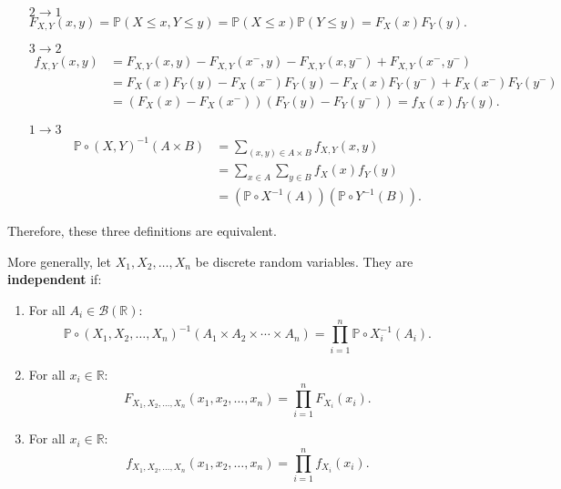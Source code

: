 \documentclass{huhtakm-template-book-v2}
\newcommand{\prob}{\mathbb{P}}
\begin{document}
    \begin{proofing}
        \begin{itemize}
            \item[$2 \to 1$]
            \begin{equation*}
                F_{X,Y}(x, y) = \prob(X \leq x,Y \leq y) = \prob(X \leq x)\prob(Y \leq y) = F_{X}(x)F_{Y}(y).
            \end{equation*}
            \item[$3 \to 2$]
            \begin{align*}
                f_{X,Y}(x, y) &= F_{X,Y}(x, y)-F_{X,Y}(x^{-},y)-F_{X,Y}(x,y^{-})+F_{X,Y}(x^{-},y^{-})\\
                &= F_{X}(x)F_{Y}(y)-F_{X}(x^{-})F_{Y}(y)-F_{X}(x)F_{Y}(y^{-})+F_{X}(x^{-})F_{Y}(y^{-})\\
                &= (F_{X}(x)-F_{X}(x^{-}))(F_{Y}(y)-F_{Y}(y^{-})) = f_{X}(x)f_{Y}(y).
            \end{align*}
            \item[$1 \to 3$]
            \begin{align*}
                \prob \circ (X,Y)^{-1}(A\times B) &= \sum_{(x, y) \in A\times B}f_{X,Y}(x, y)\\
                &= \sum_{x \in A}\sum_{y \in B}f_{X}(x)f_{Y}(y)\\
                &= (\prob \circ X^{-1}(A))(\prob \circ Y^{-1}(B)).
            \end{align*}
        \end{itemize}
        Therefore, these three definitions are equivalent.
    \end{proofing}
    \begin{rem}
        More generally, let $X_{1},X_{2},\dots,X_{n}$ be discrete random variables. They are \textbf{independent} if:
        \begin{enumerate}
            \item For all $A_{i} \in \mathcal{B}(\mathbb{R})$:
            \begin{equation*}
                \prob \circ (X_{1},X_{2},\dots,X_{n})^{-1}(A_{1}\times A_{2}\times\cdots\times A_{n}) = \prod_{i = 1}^{n}\prob \circ X_{i}^{-1}(A_{i}).
            \end{equation*}
            \item For all $x_{i} \in \mathbb{R}$:
            \begin{equation*}
                F_{X_{1},X_{2},\dots,X_{n}}(x_{1},x_{2},\dots,x_{n}) = \prod_{i = 1}^{n}F_{X_{i}}(x_{i}).
            \end{equation*}
            \item For all $x_{i} \in \mathbb{R}$:
            \begin{equation*}
                f_{X_{1},X_{2},\dots,X_{n}}(x_{1},x_{2},\dots,x_{n}) = \prod_{i = 1}^{n}f_{X_{i}}(x_{i}).
            \end{equation*}
        \end{enumerate}
    \end{rem}
    \newpage
\end{document}
